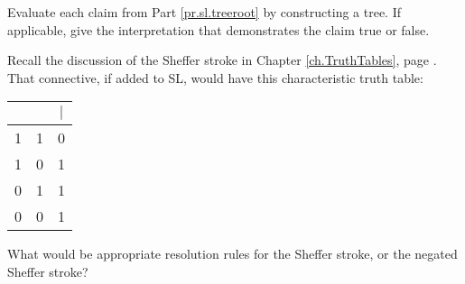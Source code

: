 \solutions
\problempart Evaluate each claim from Part \ref{pr.sl.treeroot} by constructing a tree. If applicable, give the interpretation that demonstrates the claim true or false.
\label{tree.examples}

\problempart Recall the discussion of the Sheffer stroke in Chapter \ref{ch.TruthTables}, page \pageref{pr.altConnectives}.  That connective, if added to SL, would have this characteristic truth table:

\begin{center}
\begin{tabular}{c|c|c}
\metaA{} & \metaB{} & \metaA{}$|$\metaB{}\\
\hline
1 & 1 & 0\\
1 & 0 & 1\\
0 & 1 & 1\\
0 & 0 & 1
\end{tabular}
\end{center}

What would be appropriate resolution rules for the Sheffer stroke, or the negated Sheffer stroke?
